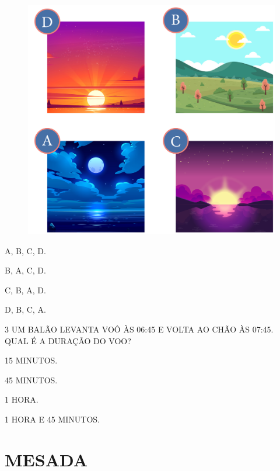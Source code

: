 \begin{figure}[htpb!]
\centering
\includegraphics[width=.6\textwidth]{./media/SAEB_1ANO_MAT_FIGURA62.png}
\end{figure}

\begin{escolha}
\item A, B, C, D.

\item B, A, C, D.

\item C, B, A, D.

\item D, B, C, A.
\end{escolha}

\num{3} UM BALÃO LEVANTA VOÔ ÀS 06:45 E VOLTA AO CHÃO ÀS 07:45. QUAL É A DURAÇÃO DO VOO?

\begin{escolha}
\item 15 MINUTOS.

\item 45 MINUTOS.

\item 1 HORA.

\item 1 HORA E 45 MINUTOS.
\end{escolha}

\chapter{MESADA}

\vspace*{-2cm}

